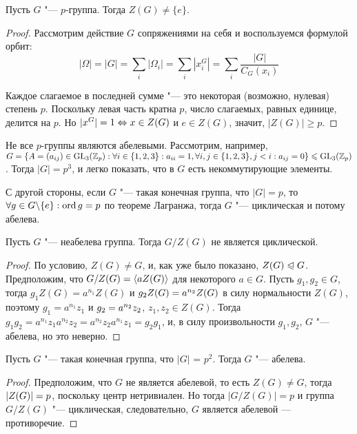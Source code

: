 \begin{theorem}
	Пусть $G$ "--- $p$-группа. Тогда $Z(G) \ne \{e\}$.
\end{theorem}

\begin{proof}
	Рассмотрим действие $G$ сопряжениями на себя и воспользуемся формулой орбит:
	\[|\Omega| = |G| = \sum\limits_i |\Omega_i| = \sum\limits_i |x_i^G| = \sum\limits_i \frac{|G|}{C_G(x_i)}\]
	
	Каждое слагаемое в последней сумме "--- это некоторая (возможно, нулевая) степень $p$. Поскольку левая часть кратна $p$, число слагаемых, равных единице, делится на $p$. Но $|x^G| = 1 \Leftrightarrow x \in Z(G)$ и $e \in Z(G)$, значит, $|Z(G)| \ge p$.
\end{proof}

\begin{example}
	Не все $p$-группы являются абелевыми. Рассмотрим, например, $G = \{A = (a_{ij}) \hm\in \GL_3(\Z_p): \forall i \in \{1, 2, 3\}: a_{ii} = 1, \forall i, j \hm\in \{1, 2, 3\}, j < i: a_{ij} = 0\} \le \GL_3(\Z_p)$. Тогда $|G| = p^3$, и легко показать, что в $G$ есть некоммутирующие элементы.
	
	С другой стороны, если $G$ "--- такая конечная группа, что $|G| = p$, то $\forall g \in G \bs \{e\}: \ord{g} \hm= p$ по теореме Лагранжа, тогда $G$ "--- циклическая и потому абелева.
\end{example}

\begin{theorem}
	Пусть $G$ "--- неабелева группа. Тогда $G / Z(G)$ не является циклической.
\end{theorem}

\begin{proof}
	По условию, $Z(G) \ne G$, и, как уже было показано, $Z(G) \trianglelefteqslant G$. Предположим, что $G / Z(G) = \langle aZ(G)\rangle$ для некоторого $a \in G$. Пусть $g_1, g_2 \in G$, тогда $g_1Z(G) = a^{n_1}Z(G)$ и $g_2Z(G) \hm= a^{n_2}Z(G)$ в силу нормальности $Z(G)$, поэтому $g_1 = a^{n_1}z_1$ и $g_2 \hm= a^{n_2}z_2$, $z_1, z_2 \in Z(G)$. Тогда $g_1g_2 = a^{n_1}z_1a^{n_2}z_2 = a^{n_2}z_2a^{n_1}z_1 = g_2g_1$, и, в силу произвольности $g_1, g_2$, $G$ "--- абелева, но это неверно.
\end{proof}

\begin{corollary}
	Пусть $G$ "--- такая конечная группа, что $|G|$ = $p^2$. Тогда $G$ "--- абелева.
\end{corollary}

\begin{proof}
	Предположим, что $G$ не является абелевой, то есть $Z(G) \ne G$, тогда $|Z(G)| \hm= p$, поскольку центр нетривиален. Но тогда $|G / Z(G)| = p$ и группа $G / Z(G)$ "--- циклическая, следовательно, $G$ является абелевой --- противоречие.
\end{proof}

